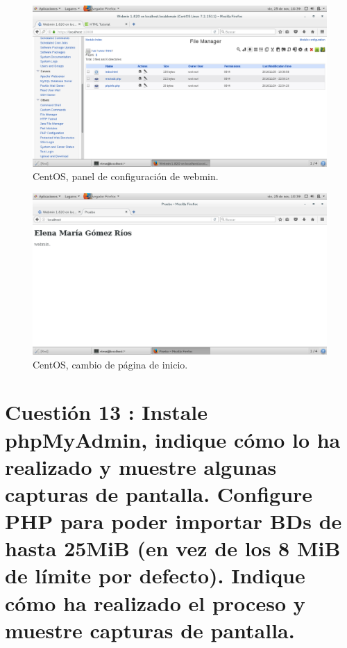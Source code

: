 \begin{figure}[H] 
	\centering
	\includegraphics[width=15cm]{./img/ejercicio12_6.png} 	
	\caption{CentOS, panel de configuración de webmin.} \label{fig:ejercicio12_6}
\end{figure}

\begin{figure}[H] 
	\centering
	\includegraphics[width=15cm]{./img/ejercicio12_7.png} 	
	\caption{CentOS, cambio de página de inicio.} \label{fig:ejercicio12_7}
\end{figure}




\section{Cuestión 13 : Instale phpMyAdmin, indique cómo lo ha realizado y muestre algunas capturas de pantalla. Configure PHP para poder importar BDs de hasta 25MiB (en vez de los 8 MiB de límite por defecto). Indique cómo ha realizado el proceso y muestre capturas de pantalla.}


